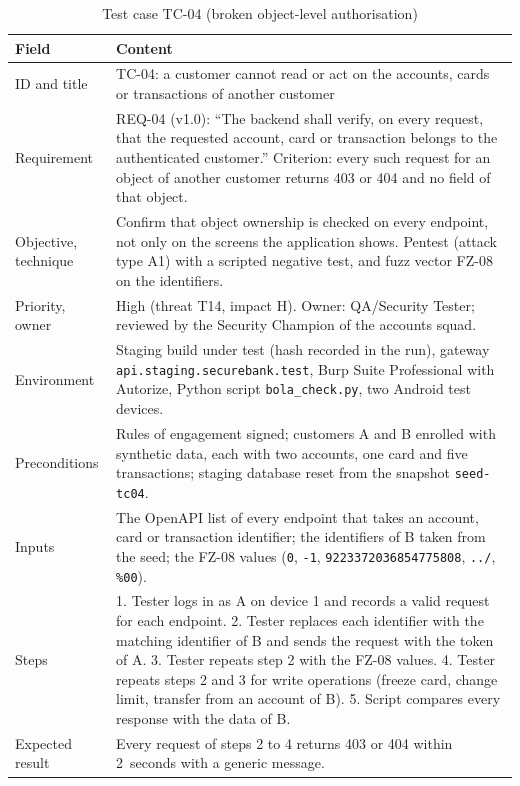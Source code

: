 \begin{table}[!h]
\caption{Test case TC-04 (broken object-level authorisation)}
\label{tab:tc04}
\centering
\footnotesize
\begin{tabularx}{\textwidth}{@{}L{3.3cm}Y@{}}
\toprule
\textbf{Field} & \textbf{Content} \\
\midrule
ID and title & TC-04: a customer cannot read or act on the accounts, cards or transactions of another customer \\
Requirement & REQ-04 (v1.0): ``The backend shall verify, on every request, that the requested account, card or transaction belongs to the authenticated customer.'' Criterion: every such request for an object of another customer returns 403 or 404 and no field of that object. \\
Objective, technique & Confirm that object ownership is checked on every endpoint, not only on the screens the application shows. Pentest (attack type A1) with a scripted negative test, and fuzz vector FZ-08 on the identifiers. \\
Priority, owner & High (threat T14, impact H). Owner: QA/Security Tester; reviewed by the Security Champion of the accounts squad. \\
Environment & Staging build under test (hash recorded in the run), gateway \texttt{api.staging.securebank.test}, Burp Suite Professional with Autorize, Python script \texttt{bola\_check.py}, two Android test devices. \\
Preconditions & Rules of engagement signed; customers A and B enrolled with synthetic data, each with two accounts, one card and five transactions; staging database reset from the snapshot \texttt{seed-tc04}. \\
Inputs & The OpenAPI list of every endpoint that takes an account, card or transaction identifier; the identifiers of B taken from the seed; the FZ-08 values (\texttt{0}, \texttt{-1}, \texttt{9223372036854775808}, \texttt{../}, \texttt{\%00}). \\
Steps & 1. Tester logs in as A on device 1 and records a valid request for each endpoint. 2. Tester replaces each identifier with the matching identifier of B and sends the request with the token of A. 3. Tester repeats step 2 with the FZ-08 values. 4. Tester repeats steps 2 and 3 for write operations (freeze card, change limit, transfer from an account of B). 5. Script compares every response with the data of B. \\
Expected result & Every request of steps 2 to 4 returns 403 or 404 within 2~seconds with a generic message. \\

\end{tabularx}
\end{table}
